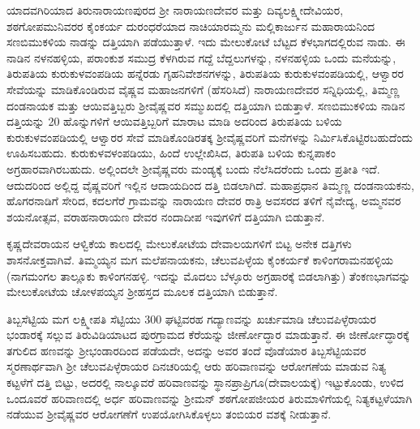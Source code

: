 ಯಾದವಗಿರಿಯಾದ ತಿರುನಾರಾಯಣಪುರದ ಶ‍್ರೀ ನಾರಾಯಣದೇವರ ಮತ್ತು ದಿವ್ಯಲಕ್ಷ್ಮೀದೇವಿಯರ, ಶಠಗೋಪಮುನಿವರರ ಕೈಂಕರ್ಯ ದುರಂಧರೆಯಾದ ನಾಚಿಯಾರಮ್ಮನು ಮಲ್ಲಿಕಾರ್ಜುನ ಮಹಾರಾಯನಿಂದ ಸಣಬಿಮುಕಳಿಯ ನಾಡನ್ನು ದತ್ತಿಯಾಗಿ ಪಡೆಯುತ್ತಾಳೆ. ಇದು ಮೇಲುಕೋಟೆ ಬೆಟ್ಟದ ಕೆಳಭಾಗದಲ್ಲಿರುವ ನಾಡು. ಈ ನಾಡಿನ ನಳನಹಳ್ಳಿಯ, ಪರಾಂಕುಶ ಸಮುದ್ರ ಕೆಳಗಿರುವ ಗದ್ದೆ ಬೆದ್ದಲುಗಳನ್ನು, ನಳನಹಳ್ಳಿಯ ಒಂದು ಮನೆಯನ್ನು, ತಿರುಪತಿಯ ಕುರುಕುಳವಂಪಡಿಯ ಹನ್ನೆರಡು ಗೃಹನಿವೇಶನಗಳನ್ನು, ತಿರುಪತಿಯ ಕುರುಕುಳವಂಪಡಿಯಲ್ಲಿ, ಆಳ್ವಾರರ ಸೇವೆಯನ್ನು ಮಾಡಿಕೊಂಡಿರುವ ವೈಷ್ಣವ ಮಹಾಜನಗಳಿಗೆ (ಹೆಸರಿಸಿದೆ) ನಾರಾಯಣದೇವರ ಸನ್ನಿಧಿಯಲ್ಲಿ, ತಿಮ್ಮಣ್ಣ ದಂಡನಾಯಕ ಮತ್ತು ಆಯಿವತ್ತಿಬ್ಬರು ಶ‍್ರೀವೈಷ್ಣವರ ಸಮ್ಮುಖದಲ್ಲಿ ದತ್ತಿಯಾಗಿ ಬಿಡುತ್ತಾಳೆ. ಸಣಬಿಮುಕಳಿಯ ನಾಡಿನ ದತ್ತಿಯನ್ನು 20 ಹೊನ್ನುಗಳಿಗೆ ಆಯಿವತ್ತಿಬ್ಬರಿಗೆ ಮಾರಾಟ ಮಾಡಿ ಅದರಿಂದ ತಿರುಪತಿಯ ಬಳಿಯ ಕುರುಕುಳವಂಪಡಿಯಲ್ಲಿ ಆಳ್ವಾರರ ಸೇವೆ ಮಾಡಿಕೊಂಡಿರತಕ್ಕ ಶ‍್ರೀವೈಷ್ಣವರಿಗೆ ಮನೆಗಳನ್ನು ನಿರ್ಮಿಸಿಕೊಟ್ಟಿರಬಹುದೆಂದು ಊಹಿಸಬಹುದು. ಕುರುಕುಳವಳಂಪಡಿಯು, ಹಿಂದೆ ಉಲ್ಲೇಖಿಸಿದ, ತಿರುಪತಿ ಬಳಿಯ ಕುನ್ನಪಾಕಂ ಅಗ್ರಹಾರವಾಗಿರಬಹುದು. ಅಲ್ಲಿಂದಲೇ ಶ‍್ರೀವೈಷ್ಣವರು ಮಂಡ್ಯಕ್ಕೆ ಬಂದು ನೆಲೆಸಿದರೆಂದು ಒಂದು ಪ್ರತೀತಿ ಇದೆ. ಆದುದರಿಂದ ಅಲ್ಲಿದ್ದ ವೈಷ್ಣವರಿಗೆ ಇಲ್ಲಿನ ಆದಾಯದಿಂದ ದತ್ತಿ ಬಿಡಲಾಗಿದೆ. ಮಹಾಪ್ರಧಾನ ತಿಮ್ಮಣ್ಣ ದಂಡನಾಯಕನು, ಹೊಗರನಾಡಿಗೆ ಸೇರಿದ, ಕದಲಗೆರೆ ಗ್ರಾಮವನ್ನು ನಾರಾಯಣ ದೇವರ ರಾತ್ರಿ ಅವಸರದ ತಳಿಗೆ ನೈವೇದ್ಯ, ಅಮ್ಮನವರ ಶಯನೋತ್ಸವ, ವರಾಹನಾರಾಯಣ ದೇವರ ನಂದಾದೀಪ ಇವುಗಳಿಗೆ ದತ್ತಿಯಾಗಿ ಬಿಡುತ್ತಾನೆ.

ಕೃಷ್ಣದೇವರಾಯನ ಆಳ್ವಿಕೆಯ ಕಾಲದಲ್ಲಿ ಮೇಲುಕೋಟೆಯ ದೇವಾಲಯಗಳಿಗೆ ಬಿಟ್ಟ ಅನೇಕ ದತ್ತಿಗಳು ಶಾಸನೋಕ್ತವಾಗಿವೆ. ತಿಮ್ಮಯ್ಯನ ಮಗ ಮಲೆಪನಾಯಕನು, ಚೆಲುವಪಿಳ್ಳೆಯ ಕೈಂಕರ್ಯಕೆ ಕಾಳಿಂಗರಾಮನಹಳ್ಳಿಯ (ನಾಗಮಂಗಲ ತಾಲ್ಲೂಕು ಕಾಳಿಂಗನಹಳ್ಳಿ. ಇದನ್ನು ಮೊದಲು ಬೆಳ್ಳೂರು ಅಗ್ರಹಾರಕ್ಕೆ ಬಿಡಲಾಗಿತ್ತು) ತೆಂಕಣಭಾಗವನ್ನು ಮೇಲುಕೋಟೆಯ ಚೋಳಪಯ್ಯನ ಶ‍್ರೀಹಸ್ತದ ಮೂಲಕ ದತ್ತಿಯಾಗಿ ಬಿಡುತ್ತಾನೆ.

ತಿಬ್ಬಸೆಟ್ಟಿಯ ಮಗ ಲಕ್ಷ್ಮೀಪತಿ ಸೆಟ್ಟಿಯು 300 ಘಟ್ಟಿವರಹ ಗದ್ಯಾಣವನ್ನು ಖರ್ಚುಮಾಡಿ ಚೆಲುವಪಿಳ್ಳೆರಾಯರ ಭಂಡಾರಕ್ಕೆ ಸಲ್ಲುವ ತಿರುವಿಡಿಯಾಟದ ಪುರಗ್ರಾಮದ ಕೆರೆಯನ್ನು ಜೀರ್ಣೋದ್ಧಾರ ಮಾಡುತ್ತಾನೆ. ಈ ಜೀರ್ಣೋದ್ಧಾರಕ್ಕೆ ತಗುಲಿದ ಹಣವನ್ನು ಶ‍್ರೀಭಂಡಾರದಿಂದ ಪಡೆಯದೇ, ಅದನ್ನು ಅವರ ತಂದೆ ವೊಡೆಯಾರ ತಿಬ್ಬಸೆಟ್ಟಿಯವರ ಸ್ಮರಣಾರ್ಥವಾಗಿ ಶ‍್ರೀ ಚೆಲುವಪಿಳ್ಳೆರಾಯರ ದಿನಚರಿಯಲ್ಲಿ ಆರು ಹರಿವಾಣವನ್ನು ಆರೋಗಣೆಯ ಮಾಡುವ ನಿತ್ಯ ಕಟ್ಟಳೆಗೆ ದತ್ತಿ ಬಿಟ್ಟು, ಅದರಲ್ಲಿ ನಾಲ್ಕೂವರೆ ಹರಿವಾಣವನ್ನು ಸ್ಥಾನಪ್ರಾಪ್ರಿಗೂ(ದೇವಾಲಯಕ್ಕೆ) ಇಟ್ಟುಕೊಂಡು, ಉಳಿದ ಒಂದೂವರೆ ಹರಿವಾಣದಲ್ಲಿ ಅರ್ಧ ಹರಿವಾಣವನ್ನು ಶ‍್ರೀಮನ್​ ಶಠಗೋಪಜೀಯರ ತಿರುಮಾಳಿಗೆಯಲ್ಲಿ ನಿತ್ಯಕಟ್ಟಳೆಯಾಗಿ ನಡೆಯುವ ಶ‍್ರೀವೈಷ್ಣವರ ಆರೋಗಣೆಗೆ ಉಪಯೋಗಿಸಿಕೊಳ್ಳಲು ತಂಬಿಯರ ವಶಕ್ಕೆ ನೀಡುತ್ತಾನೆ.

